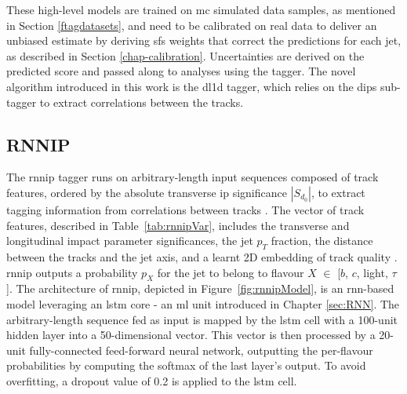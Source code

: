 These high-level models are trained on \gls{mc} simulated data samples, as mentioned in Section \ref{ftagdatasets}, and need to be calibrated on real data to deliver an unbiased estimate by deriving \glspl{sf} weights that correct the predictions for each jet, as described in Section \ref{chap-calibration}. Uncertainties are derived on the predicted score and passed along to analyses using the tagger. The novel algorithm introduced in this work is the \gls{dl1d} tagger, which relies on the \gls{dips} sub-tagger to extract correlations between the tracks.  

\subsection{RNNIP}
The \gls{rnnip} tagger runs on arbitrary-length input sequences composed of track features, ordered by the absolute transverse \gls{ip} significance $|S_{d_0}|$, to extract tagging information from correlations between tracks \cite{ATL-PHYS-PUB-2017-003}. The vector of track features, described in Table~\ref{tab:rnnipVar}, includes the transverse and longitudinal impact parameter significances, the jet $p_T$ fraction, the distance between the tracks and the jet axis, and a learnt 2D embedding of track quality \cite{Paganini:2289214}. \gls{rnnip} outputs a probability $p_X$ for the jet to belong to flavour $X$ $\in$ [$b$, $c$, light, $\tau$]. The architecture of \gls{rnnip}, depicted in Figure~\ref{fig:rnnipModel}, is an \gls{rnn}-based model leveraging an \gls{lstm} core - an \gls{ml} unit introduced in Chapter \ref{sec:RNN}. The arbitrary-length sequence fed as input is mapped by the \gls{lstm} cell with a 100-unit hidden layer into a 50-dimensional vector. This vector is then processed by a 20-unit fully-connected feed-forward neural network, outputting the per-flavour probabilities by computing the softmax of the last layer's output. To avoid overfitting, a dropout value of 0.2 is applied to the \gls{lstm} cell. \\

